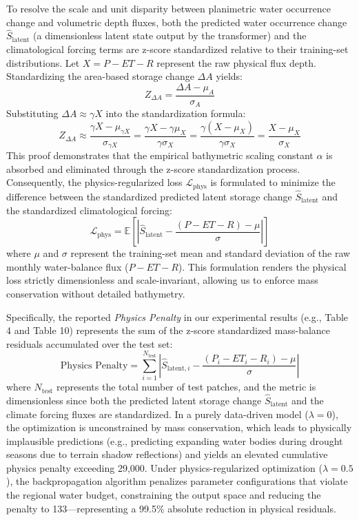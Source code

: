 \documentclass[preprint,12pt]{elsarticle}
\begin{document}
To resolve the scale and unit disparity between planimetric water occurrence change and volumetric depth fluxes, both the predicted water occurrence change $\hat{S}_{\text{latent}}$ (a dimensionless latent state output by the transformer) and the climatological forcing terms are z-score standardized relative to their training-set distributions. Let $X = P - ET - R$ represent the raw physical flux depth. Standardizing the area-based storage change $\Delta A$ yields:
\begin{equation}
Z_{\Delta A} = \frac{\Delta A - \mu_A}{\sigma_A}
\end{equation}
Substituting $\Delta A \approx \gamma X$ into the standardization formula:
\begin{equation}
Z_{\Delta A} \approx \frac{\gamma X - \mu_{\gamma X}}{\sigma_{\gamma X}} = \frac{\gamma X - \gamma \mu_X}{\gamma \sigma_X} = \frac{\gamma(X - \mu_X)}{\gamma \sigma_X} = \frac{X - \mu_X}{\sigma_X}
\end{equation}
This proof demonstrates that the empirical bathymetric scaling constant $\alpha$ is absorbed and eliminated through the z-score standardization process. Consequently, the physics-regularized loss $\mathcal{L}_{\text{phys}}$ is formulated to minimize the difference between the standardized predicted latent storage change $\hat{S}_{\text{latent}}$ and the standardized climatological forcing:
\begin{equation}
\mathcal{L}_{\text{phys}} = \mathbb{E}\left[\left|\hat{S}_{\text{latent}} - \frac{(P - ET - R) - \mu}{\sigma}\right|\right]
\end{equation}
where $\mu$ and $\sigma$ represent the training-set mean and standard deviation of the raw monthly water-balance flux ($P - ET - R$). This formulation renders the physical loss strictly dimensionless and scale-invariant, allowing us to enforce mass conservation without detailed bathymetry.

Specifically, the reported \textit{Physics Penalty} in our experimental results (e.g., Table 4 and Table 10) represents the sum of the z-score standardized mass-balance residuals accumulated over the test set:
\begin{equation}
\text{Physics Penalty} = \sum_{i=1}^{N_{\text{test}}} \left|\hat{S}_{\text{latent}, i} - \frac{(P_i - ET_i - R_i) - \mu}{\sigma}\right|
\end{equation}
where $N_{\text{test}}$ represents the total number of test patches, and the metric is dimensionless since both the predicted latent storage change $\hat{S}_{\text{latent}}$ and the climate forcing fluxes are standardized. In a purely data-driven model ($\lambda = 0$), the optimization is unconstrained by mass conservation, which leads to physically implausible predictions (e.g., predicting expanding water bodies during drought seasons due to terrain shadow reflections) and yields an elevated cumulative physics penalty exceeding 29,000. Under physics-regularized optimization ($\lambda = 0.5$), the backpropagation algorithm penalizes parameter configurations that violate the regional water budget, constraining the output space and reducing the penalty to 133---representing a 99.5\% absolute reduction in physical residuals.
\end{document}
